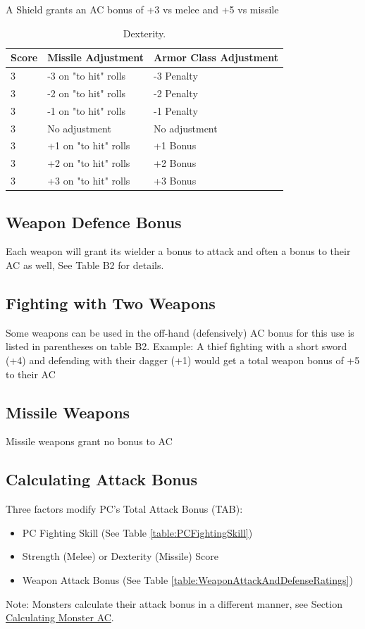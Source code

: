 \documentclass[letterpaper,sansserif,tightsqueeze]{rpg-module}
\begin{document}
A Shield grants an AC bonus of +3 vs melee and +5 vs missile

\begin{table}[h!]
	\centering
	\begin{tabular}{|l|l|l|}
		\hline
		\textbf{Score}	& \textbf{Missile Adjustment}	& \textbf{Armor Class Adjustment} 	\\ \hline
		3		& -3 on "to hit" rolls	& -3 Penalty				\\ \hline
		3		& -2 on "to hit" rolls	& -2 Penalty				\\ \hline
		3		& -1 on "to hit" rolls	& -1 Penalty				\\ \hline
		3		& No adjustment			& No adjustment				\\ \hline
		3		& +1 on "to hit" rolls	& +1 Bonus					\\ \hline
		3		& +2 on "to hit" rolls	& +2 Bonus					\\ \hline
		3		& +3 on "to hit" rolls	& +3 Bonus					\\ \hline
	\end{tabular}
	\caption{Dexterity.}
	\label{table:Dexterity}
\end{table}

\subsection*{Weapon Defence Bonus}
Each weapon will grant its wielder a bonus to attack and often a bonus to their AC as well, See Table B2 for details.

\subsection*{Fighting with Two Weapons}
Some weapons can be used in the off-hand (defensively) AC bonus for this use is listed in parentheses on table B2.
Example:
A thief fighting with a short sword (+4) and defending with their dagger (+1) would get a total weapon bonus of +5 to their AC

\subsection*{Missile Weapons}
Missile weapons grant no bonus to AC

\vspace{0.5cm}

\subsection*{Calculating Attack Bonus}
Three factors modify PC’s Total Attack Bonus (TAB):
\begin{itemize}
	\item PC Fighting Skill (See Table \ref{table:PCFightingSkill})
	\item Strength (Melee) or Dexterity (Missile) Score
	\item Weapon Attack Bonus (See Table \ref{table:WeaponAttackAndDefenseRatings})
\end{itemize}
Note: Monsters calculate their attack bonus in a different manner, see Section \hyperref[subsection:MonsterAC]{Calculating Monster AC}.
\end{document}
